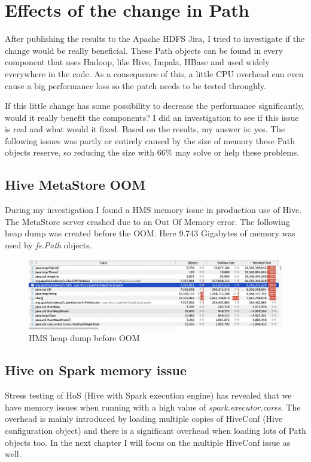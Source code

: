 \section{Effects of the change in Path}
After publishing the results to the Apache HDFS Jira, I tried to investigate if the change would be really beneficial. These Path objects can be found in every component that uses Hadoop, like Hive, Impala, HBase \etc and used widely everywhere in the code. As a consequence of this, a little CPU overhead can even cause a big performance loss so the patch needs to be tested throughly. 

If this little change has some possibility to decrease the performance significantly, would it really benefit the components? I did an investigation to see if this issue is real and what would it fixed. Based on the results, my answer is: yes. The following issues was partly or entirely caused by the size of memory these Path objects reserve, so reducing the size with 66\% may solve or help these problems.

\subsection{Hive MetaStore OOM}
During my investigation I found a HMS memory issue in production use of Hive. The MetaStore server crashed due to an Out Of Memory error. The following heap dump was created before the OOM. Here 9.743 Gigabytes of memory was used by \textit{fs.Path} objects.

\begin{figure}[H]
	\includegraphics[width=150mm, keepaspectratio]{figures/hms_heapdump.png}
	\centering
	\caption{HMS heap dump before OOM}
\end{figure}

\subsection{Hive on Spark memory issue}
Stress testing of HoS (Hive with Spark execution engine) has revealed that we have memory issues when running with a high value of \textit{spark.executor.cores}. The overhead is mainly introduced by loading multiple copies of HiveConf (Hive configuration object) and there is a significant overhead when loading lots of Path objects too. In the next chapter I will focus on the multiple HiveConf issue as well.

